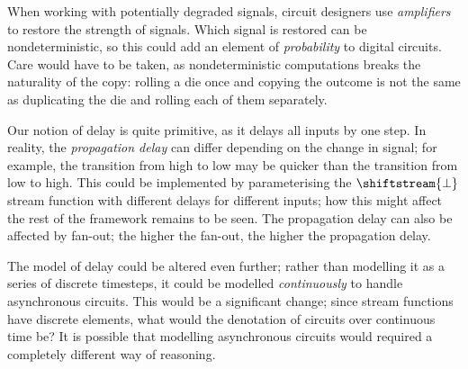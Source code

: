 When working with potentially degraded signals, circuit designers use
\emph{amplifiers} to restore the strength of signals.
Which signal is restored can be nondeterministic, so this could add an element
of \emph{probability} to digital circuits.
Care would have to be taken, as nondeterministic computations breaks the
naturality of the copy: rolling a die once and copying the outcome is not the
same as duplicating the die and rolling each of them separately.

Our notion of delay is quite primitive, as it delays all inputs by one step.
In reality, the \emph{propagation delay} can differ depending on the change in
signal; for example, the transition from high to low may be quicker than the
transition from low to high.
This could be implemented by parameterising the \(\shiftstream{\bot}\) stream
function with different delays for different inputs; how this might affect the
rest of the framework remains to be seen.
The propagation delay can also be affected by fan-out; the higher the fan-out,
the higher the propagation delay.

The model of delay could be altered even further; rather than modelling
it as a series of discrete timesteps, it could be modelled \emph{continuously}
to handle asynchronous circuits.
This would be a significant change; since stream
functions have discrete elements, what would the denotation of circuits over
continuous time be?
It is possible that modelling asynchronous circuits would required a completely
different way of reasoning.